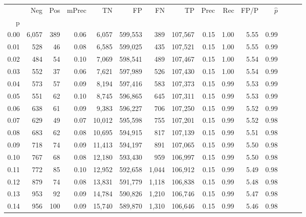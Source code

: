 \begin{tabular}{rrrrrrrrrrrrrrr}
\toprule
{} &     Neg &     Pos & mPrec &       TN &       FP &       FN &       TP &  Prec &   Rec &  FP/P & $\hat{p}$ \\
p    &         &         &       &          &          &          &          &       &       &       &           \\
\midrule
0.00 &   6,057 &     389 &  0.06 &    6,057 &  599,553 &      389 &  107,567 &  0.15 &  1.00 &  5.55 &      0.99 \\
0.01 &     528 &      46 &  0.08 &    6,585 &  599,025 &      435 &  107,521 &  0.15 &  1.00 &  5.55 &      0.99 \\
0.02 &     484 &      54 &  0.10 &    7,069 &  598,541 &      489 &  107,467 &  0.15 &  1.00 &  5.54 &      0.99 \\
0.03 &     552 &      37 &  0.06 &    7,621 &  597,989 &      526 &  107,430 &  0.15 &  1.00 &  5.54 &      0.99 \\
0.04 &     573 &      57 &  0.09 &    8,194 &  597,416 &      583 &  107,373 &  0.15 &  0.99 &  5.53 &      0.99 \\
0.05 &     551 &      62 &  0.10 &    8,745 &  596,865 &      645 &  107,311 &  0.15 &  0.99 &  5.53 &      0.99 \\
0.06 &     638 &      61 &  0.09 &    9,383 &  596,227 &      706 &  107,250 &  0.15 &  0.99 &  5.52 &      0.99 \\
0.07 &     629 &      49 &  0.07 &   10,012 &  595,598 &      755 &  107,201 &  0.15 &  0.99 &  5.52 &      0.98 \\
0.08 &     683 &      62 &  0.08 &   10,695 &  594,915 &      817 &  107,139 &  0.15 &  0.99 &  5.51 &      0.98 \\
0.09 &     718 &      74 &  0.09 &   11,413 &  594,197 &      891 &  107,065 &  0.15 &  0.99 &  5.50 &      0.98 \\
0.10 &     767 &      68 &  0.08 &   12,180 &  593,430 &      959 &  106,997 &  0.15 &  0.99 &  5.50 &      0.98 \\
0.11 &     772 &      85 &  0.10 &   12,952 &  592,658 &    1,044 &  106,912 &  0.15 &  0.99 &  5.49 &      0.98 \\
0.12 &     879 &      74 &  0.08 &   13,831 &  591,779 &    1,118 &  106,838 &  0.15 &  0.99 &  5.48 &      0.98 \\
0.13 &     953 &      92 &  0.09 &   14,784 &  590,826 &    1,210 &  106,746 &  0.15 &  0.99 &  5.47 &      0.98 \\
0.14 &     956 &     100 &  0.09 &   15,740 &  589,870 &    1,310 &  106,646 &  0.15 &  0.99 &  5.46 &      0.98 \\

\end{tabular}
